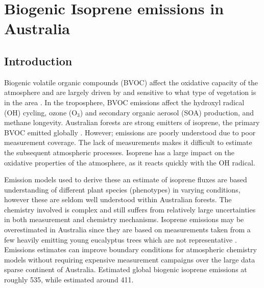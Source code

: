 
%
%



\chapter{Biogenic Isoprene emissions in Australia} %
\label{BioIsop}
  
\section{Introduction}  
\label{BioIsop:intro}  
  
  
  
  Biogenic volatile organic compounds (BVOC) affect the oxidative capacity of the atmosphere and are largely driven by and sensitive to what type of vegetation is in the area \parencite{Kefauver2014}.
  In the troposphere, BVOC emissions affect the hydroxyl radical (OH) cycling, ozone (O$_3$) and secondary organic aerosol (SOA) production, and methane longevity.
  Australian forests are strong emitters of isoprene, the primary BVOC emitted globally \parencite{Guenther2006,Messina2016}. %
  However; emissions are poorly understood due to poor measurement coverage.
  The lack of measurements makes it difficult to estimate the subsequent atmospheric processes.%
  Isoprene has a large impact on the oxidative properties of the atmosphere, as it reacts quickly with the OH radical.
  
  Emission models used to derive these an estimate of isoprene fluxes are based understanding of different plant species (phenotypes) in varying conditions, however these are seldom well understood within Australian forests.
  The chemistry involved is complex and still suffers from relatively large uncertainties in both measurement and chemistry mechanisms.
  Isoprene emissions may be overestimated in Australia since they are based on measurements taken from a few heavily emitting young eucalyptus trees which are not representative \parencite{Winters2009, FortemsCheiney2012,}.
  Emissions estimates can improve boundary conditions for atmospheric chemistry models without requiring expensive measurement campaigns over the large data sparse continent of Australia.
  \textcite{Guenther2012} Estimated global biogenic isoprene emissions at roughly 535\tgpyr, while \textcite{Sindelarova2014} estimated around 411\tgpyr.
  
